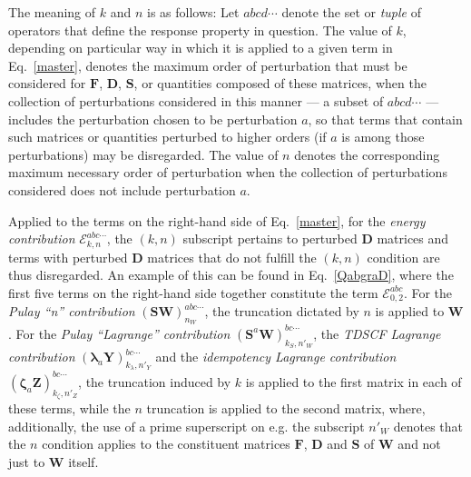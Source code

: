 \documentclass[%
 reprint,
 amsmath,amssymb,
 aps,
]{revtex4-1}
\begin{document}
The meaning of $k$ and $n$ is as follows: Let $abcd\cdots$ denote the set or \textit{tuple} of operators that define the response property in question. The value of $k$, depending on particular way in which it is applied to a given term in Eq.~\eqref{master}, denotes the maximum order of perturbation that must be considered for $\mathbf{F}$, $\mathbf{D}$, $\mathbf{S}$, or quantities composed of these matrices, when the collection of perturbations considered in this manner --- a subset of $abcd\cdots$ --- includes the perturbation chosen to be perturbation $a$, so that terms that contain such matrices or quantities perturbed to higher orders (if $a$ is among those perturbations) may be disregarded. The value of $n$ denotes the corresponding maximum necessary order of perturbation when the collection of perturbations considered does not include perturbation $a$.

Applied to the terms on the right-hand side of Eq.~\eqref{master}, for the \textit{energy contribution} $\mathcal{E}_{k,n}^{abc\cdots}$, the $(k,n)$ subscript pertains to perturbed $\mathbf{D}$ matrices and terms with perturbed $\mathbf{D}$ matrices that do not fulfill the $(k,n)$ condition are thus disregarded. An example of this can be found in Eq.~\eqref{QabgraD}, where the first five terms on the right-hand side together constitute the term $\mathcal{E}_{0,2}^{abc}$. For the \textit{Pulay ``n'' contribution}  $(\mathbf{SW})_{n_{W}}^{abc\cdots}$, the truncation dictated by $n$ is applied to $\mathbf{W}$. For the \textit{Pulay ``Lagrange'' contribution} $(\mathbf{S}^{a}\mathbf{W})_{k_{S},n'_{W}}^{bc\cdots}$, the \textit{TDSCF Lagrange contribution} $(\mathbf{\lambda}_{a}\mathbf{Y})_{k_{\lambda},n'_{Y}}^{bc\cdots}$ and the \textit{idempotency Lagrange contribution} $(\mathbf{\zeta}_{a}\mathbf{Z})_{k_{\zeta},n'_{Z}}^{bc\cdots}$, the truncation induced by $k$ is applied to the first matrix in each of these terms, while the $n$ truncation is applied to the second matrix, where, additionally, the use of a prime superscript on e.g. the subscript $n'_{W}$ denotes that the $n$ condition applies to the constituent matrices $\mathbf{F}$, $\mathbf{D}$ and $\mathbf{S}$ of $\mathbf{W}$ and not just to $\mathbf{W}$ itself.
\end{document}
